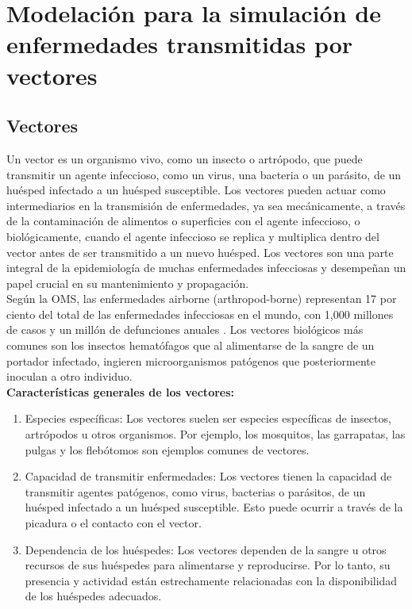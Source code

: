 \chapter{Modelación para la simulación de enfermedades transmitidas por vectores}\label{chapter:proposal}
\section{Vectores}
Un vector es un organismo vivo, como un insecto o artrópodo, que puede transmitir un agente 
infeccioso, como un virus, una bacteria o un parásito, de un huésped infectado a un huésped 
susceptible. Los vectores pueden actuar como intermediarios en la transmisión de enfermedades, 
ya sea mecánicamente, a través de la contaminación de alimentos o superficies con el agente 
infeccioso, o biológicamente, cuando el agente infeccioso se replica y multiplica dentro del 
vector antes de ser transmitido a un nuevo huésped. Los vectores son una parte integral de la 
epidemiología de muchas enfermedades infecciosas y desempeñan un papel crucial en su mantenimiento 
y propagación.\autocite{Reisen2010}\\

Según la OMS, las enfermedades airborne (arthropod-borne) representan 17 por ciento del total de 
las enfermedades infecciosas en el mundo, con 1,000 millones de casos y un millón de defunciones 
anuales \autocite{OMS2020}. Los vectores biológicos más comunes son los insectos hematófagos que 
al alimentarse de la sangre de un portador infectado, ingieren microorganismos patógenos que 
posteriormente inoculan a otro individuo.\\

\textbf{Características generales de los vectores:}\autocite{OMS2020}
\begin{enumerate}
    \item Especies específicas: Los vectores suelen ser especies específicas de insectos, 
    artrópodos u otros organismos. Por ejemplo, los mosquitos, las garrapatas, las pulgas y los 
    flebótomos son ejemplos comunes de vectores. 
    \item Capacidad de transmitir enfermedades: Los vectores tienen la capacidad de transmitir 
    agentes patógenos, como virus, bacterias o parásitos, de un huésped infectado a un huésped 
    susceptible. Esto puede ocurrir a través de la picadura o el contacto con el vector.
    \item Dependencia de los huéspedes: Los vectores dependen de la sangre u otros recursos de 
    sus huéspedes para alimentarse y reproducirse. Por lo tanto, su presencia y actividad están 
    estrechamente relacionadas con la disponibilidad de los huéspedes adecuados.
\end{enumerate}
